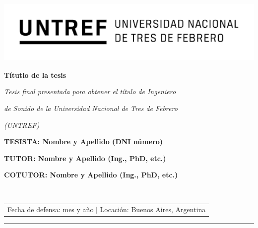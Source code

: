 \documentclass[12pt]{article}
\begin{document}
\begin{titlepage}
\centering
\includegraphics[width=13.58cm, height=3.1cm]{Logo Untref.png} 

\vspace{0.1cm}

\hspace*{-1.31cm}%
\begin{minipage}[t]{16cm}
\centering
{}
\vspace{0.5cm} %

\end{minipage}


\vspace{36pt}

{\bfseries\fontsize{22pt}{18pt} \selectfont Títutlo de la tesis \par}

\vspace{42pt}


\vspace{64pt}

{\centering\itshape\fontsize{14pt}{1pt}\selectfont Tesis final presentada para obtener el título de Ingeniero\par}
{\centering\itshape\fontsize{14pt}{1pt}\selectfont de Sonido de la Universidad Nacional de Tres de Febrero \par}
{\centering\itshape\fontsize{14pt}{1pt}\selectfont (UNTREF) \par}

\vspace{70pt}

{\bfseries\fontsize{14pt}{0pt}\selectfont TESISTA: Nombre y Apellido (DNI número) \par}
{\bfseries\fontsize{14pt}{0pt}\selectfont TUTOR: Nombre y Apellido (Ing., PhD, etc.) \par}
{\bfseries\fontsize{14pt}{0pt}\selectfont COTUTOR: Nombre y Apellido (Ing., PhD, etc.) \par}

\vfill

\begin{table}[h]
\hrulefill \\ 
\begin{tabular}{c}
Fecha de defensa: mes y año $\lvert$ Locación: Buenos Aires, Argentina \\
\end{tabular}
\end{table}
\hrule
\end{titlepage}
\end{document}
